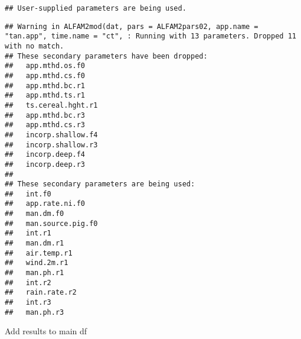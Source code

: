 \documentclass[
  landscape]{article}
\newenvironment{Shaded}{\begin{snugshade}}{\end{snugshade}}
\newcommand{\DecValTok}[1]{\textcolor[rgb]{0.00,0.00,0.81}{#1}}
\newcommand{\FunctionTok}[1]{\textcolor[rgb]{0.13,0.29,0.53}{\textbf{#1}}}
\newcommand{\NormalTok}[1]{#1}
\newcommand{\OtherTok}[1]{\textcolor[rgb]{0.56,0.35,0.01}{#1}}
\newcommand{\SpecialCharTok}[1]{\textcolor[rgb]{0.81,0.36,0.00}{\textbf{#1}}}
\newcommand{\StringTok}[1]{\textcolor[rgb]{0.31,0.60,0.02}{#1}}
\begin{document}
\begin{verbatim}
## User-supplied parameters are being used.
\end{verbatim}

\begin{verbatim}
## Warning in ALFAM2mod(dat, pars = ALFAM2pars02, app.name = "tan.app", time.name = "ct", : Running with 13 parameters. Dropped 11 with no match.
## These secondary parameters have been dropped:
##   app.mthd.os.f0
##   app.mthd.cs.f0
##   app.mthd.bc.r1
##   app.mthd.ts.r1
##   ts.cereal.hght.r1
##   app.mthd.bc.r3
##   app.mthd.cs.r3
##   incorp.shallow.f4
##   incorp.shallow.r3
##   incorp.deep.f4
##   incorp.deep.r3
## 
## These secondary parameters are being used:
##   int.f0
##   app.rate.ni.f0
##   man.dm.f0
##   man.source.pig.f0
##   int.r1
##   man.dm.r1
##   air.temp.r1
##   wind.2m.r1
##   man.ph.r1
##   int.r2
##   rain.rate.r2
##   int.r3
##   man.ph.r3
\end{verbatim}

Add results to main df

\begin{Shaded}
\end{Shaded}
\end{document}
